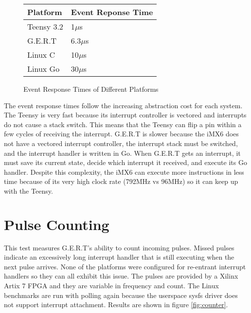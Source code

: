 


\begin{figure} [h]
\begin{center}
  \begin{tabular}{ | l | l |}
    \hline
    Platform & Event Reponse Time \\ \hline
    Teensy 3.2 & 1$\mu$s \\ \hline
    G.E.R.T & 6.3$\mu$s \\ \hline
    Linux C & 10$\mu$s \\ \hline
    Linux Go & 30$\mu$s \\
    \hline
  \end{tabular}
\end{center}
  \caption{Event Response Times of Different Platforms}  \label{fig:RT}
\end{figure}

The event response times follow the increasing abstraction cost for each system.
The Teensy is very fast because its interrupt controller is vectored and interrupts
do not cause a stack switch. This means that the Teensy can flip a pin within a few cycles
of receiving the interrupt. G.E.R.T is slower because the iMX6 does not have a
vectored interrupt controller, the interrupt stack must be switched, and the
interrupt handler is written in Go. When G.E.R.T gets an interrupt, it must save its
current state, decide which interrupt it received, and execute its Go handler. Despite this
complexity, the iMX6 can execute more instructions in less time because of its very
high clock rate (792MHz vs 96MHz) so it can keep up with the Teensy.


\section{Pulse Counting}\label{sec:pulse_count}
This test measures G.E.R.T's ability to count incoming pulses. Missed pulses
indicate an excessively long interrupt handler that is still executing when the next
pulse arrives. None of the platforms were configured for re-entrant interrupt handlers
so they can all exhibit this issue.
The pulses are provided by a Xilinx Artix 7 FPGA and they are variable in
frequency and count. The Linux benchmarks are run with polling again because the
userspace sysfs driver does not support interrupt attachment.
Results are shown in figure \ref{fig:counter}.


